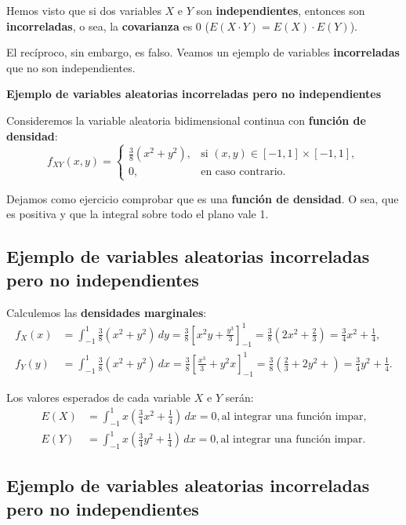 \documentclass[]{book}
\begin{document}
Hemos visto que si dos variables \(X\) e \(Y\) son \textbf{independientes}, entonces son \textbf{incorreladas}, o sea, la \textbf{covarianza} es 0 (\(E(X\cdot Y)=E(X)\cdot E(Y)\)).

El recíproco, sin embargo, es falso. Veamos un ejemplo de variables \textbf{incorreladas} que no son independientes.

\textbf{Ejemplo de variables aleatorias incorreladas pero no independientes}

Consideremos la variable aleatoria bidimensional continua con \textbf{función de densidad}:
\[
f_{XY}(x,y)=\begin{cases}
\frac{3}{8}(x^2+y^2), & \mbox{si }(x,y)\in [-1,1]\times [-1,1],\\
0, & \mbox{en caso contrario.}
\end{cases}
\]

Dejamos como ejercicio comprobar que es una \textbf{función de densidad}. O sea, que es positiva y que la integral sobre todo el plano vale 1.

\hypertarget{ejemplo-de-variables-aleatorias-incorreladas-pero-no-independientes}{%
\subsection{Ejemplo de variables aleatorias incorreladas pero no independientes}\label{ejemplo-de-variables-aleatorias-incorreladas-pero-no-independientes}}

Calculemos las \textbf{densidades marginales}:
\[
\begin{array}{rl}
f_X(x) & = \int_{-1}^{1} \frac{3}{8}(x^2+y^2)\, dy = \frac{3}{8}\left[x^2 y+\frac{y^3}{3}\right]_{-1}^1 =\frac{3}{8}\left(2 x^2+\frac{2}{3}\right)=\frac{3}{4} x^2+\frac{1}{4}, \\
f_Y(y) & = \int_{-1}^{1} \frac{3}{8}(x^2+y^2)\, dx = \frac{3}{8}\left[\frac{x^3}{3}+y^2 x\right]_{-1}^1 =\frac{3}{8}\left(\frac{2}{3}+2 y^2+\right)=\frac{3}{4} y^2+\frac{1}{4}.
\end{array}
\]

Los valores esperados de cada variable \(X\) e \(Y\) serán:
\[
\begin{array}{rl}
E(X) & =\int_{-1}^1 x \left(\frac{3}{4} x^2+\frac{1}{4}\right)\, dx =0, \mbox{al integrar una función impar,}\\
E(Y) & =\int_{-1}^1 x \left(\frac{3}{4} y^2+\frac{1}{4}\right)\, dx =0, \mbox{al integrar una función impar.}
\end{array}
\]

\hypertarget{ejemplo-de-variables-aleatorias-incorreladas-pero-no-independientes-1}{%
\subsection{Ejemplo de variables aleatorias incorreladas pero no independientes}\label{ejemplo-de-variables-aleatorias-incorreladas-pero-no-independientes-1}}
\end{document}
